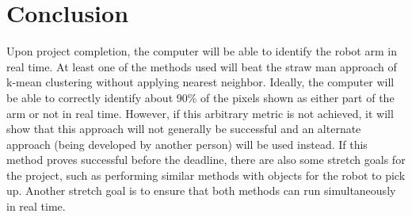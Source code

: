 \documentclass[10pt,journal,compsoc, draftclsnofoot,onecolumn]{IEEEtran}
\begin{document}
\section{Conclusion}
Upon project completion, the computer will be able to identify the robot arm in real time.
At least one of the methods used will beat the straw man approach of k-mean clustering without applying nearest neighbor.
Ideally, the computer will be able to correctly identify about 90\% of the pixels shown as either part of the arm or not in real time.%
However, if this arbitrary metric is not achieved, it will show that this approach will not generally
be successful and an alternate approach (being developed by another person) will be used instead.
If this method proves successful before the deadline, there are also some stretch goals for the project, such as performing similar methods with objects for the robot to pick up.
Another stretch goal is to ensure that both methods can run simultaneously in real time.

\newpage
\nocite{*}%


\end{document}
